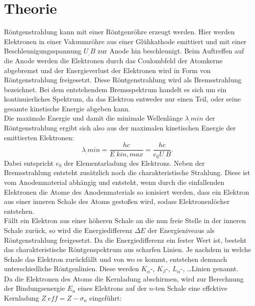 
\section{Theorie}
\label{sec:Theorie}


Röntgenstrahlung kann mit einer Röntgenröhre erzeugt werden. Hier werden Elektronen in einer Vakuumröhre aus einer Glühkathode emittiert und mit einer Beschleunigungsspannung $U_.B$ zur Anode hin beschleunigt. 
Beim Auftreffen auf die Anode werden die Elektronen durch das Coulombfeld der Atomkerne abgebremst und der Energieverlust der Elektronen wird in Form von Röntgenstrahlung freigesetzt. Diese Röntgenstrahlung wird als Bremsstrahlung bezeichnet. Bei dem entstehendem Bremsspektrum handelt es sich um ein kontinuierliches Spektrum, da das Elektron entweder nur einen Teil, oder seine gesamte kinetische Energie abgeben kann.\\
Die maximale Energie und damit die minimale Wellenlänge $\lambda_.{min}$ der Röntgenstrahlung ergibt sich also aus der maximalen kinetischen Energie der emittierten Elektronen:
\begin{equation}
\lambda_.{min} = \frac{hc}{E_.{kin,max}} = \frac{hc}{e_0U_.B}\text{.}\label{eq:lambda_min}
\end{equation}
Dabei entspricht $e_0$ der Elementarladung des Elektrons.
Neben der Bremsstrahlung entsteht zusätzlich noch die charakteristische Strahlung. Diese ist vom Anodenmaterial abhängig und entsteht, wenn durch die einfallenden Elektronen die Atome des Anodenmaterials so ionisiert werden, dass ein Elektron aus einer inneren Schale des Atoms gestoßen wird, sodass Elektronenlöcher entstehen.\\
Fällt ein Elektron aus einer höheren Schale an die nun freie Stelle in der inneren Schale zurück, so wird die Energiedifferenz $\Delta E$ der Energieniveaus als Röntgenstrahlung freigesetzt. Da die Energiedifferenz ein fester Wert ist, besteht das charakteristische Röntgenspektrum aus scharfen Linien. Je nachdem in welche Schale das Elektron zurückfällt und von wo es kommt, entstehen demnach unterschiedliche Röntgenlinien. Diese werden $K_\alpha$-, $K_\beta$-, $L_\alpha$-, \dots Linien genannt.\\
Da die Elektronen des Atoms die Kernladung abschirmen, wird zur Berechnung der Bindungsenergie $E_n$ eines Elektrons auf der $n$-ten Schale eine effektive Kernladung $Z_.{eff} = Z-\sigma_n$ eingeführt:
